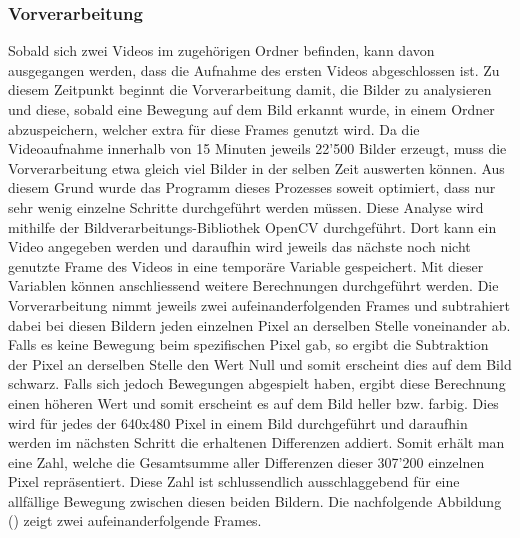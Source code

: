 \subsubsection{Vorverarbeitung}
Sobald sich zwei Videos im zugehörigen Ordner befinden, kann davon ausgegangen werden, dass die Aufnahme des ersten Videos abgeschlossen ist. Zu diesem Zeitpunkt beginnt die Vorverarbeitung damit, die Bilder zu analysieren und diese, sobald eine Bewegung auf dem Bild erkannt wurde, in einem Ordner abzuspeichern, welcher extra für diese Frames genutzt wird. Da die Videoaufnahme innerhalb von 15 Minuten jeweils 22'500 Bilder erzeugt, muss die Vorverarbeitung etwa gleich viel Bilder in der selben Zeit auswerten können. Aus diesem Grund wurde das Programm dieses Prozesses soweit optimiert, dass nur sehr wenig einzelne Schritte durchgeführt werden müssen. Diese Analyse wird mithilfe der Bildverarbeitungs-Bibliothek OpenCV durchgeführt. Dort kann ein Video angegeben werden und daraufhin wird jeweils das nächste noch nicht genutzte Frame des Videos in eine temporäre Variable gespeichert. Mit dieser Variablen können anschliessend weitere Berechnungen durchgeführt werden. Die Vorverarbeitung nimmt jeweils zwei aufeinanderfolgenden Frames und subtrahiert dabei bei diesen Bildern jeden einzelnen Pixel an derselben Stelle voneinander ab. Falls es keine Bewegung beim spezifischen Pixel gab, so ergibt die Subtraktion der Pixel an derselben Stelle den Wert Null und somit erscheint dies auf dem Bild schwarz. Falls sich jedoch Bewegungen abgespielt haben, ergibt diese Berechnung einen höheren Wert und somit erscheint es auf dem Bild heller bzw. farbig. Dies wird für jedes der 640x480 Pixel in einem Bild durchgeführt und daraufhin werden im nächsten Schritt die erhaltenen Differenzen addiert. Somit erhält man eine Zahl, welche die Gesamtsumme aller Differenzen dieser 307'200 einzelnen Pixel repräsentiert. Diese Zahl ist schlussendlich ausschlaggebend für eine allfällige Bewegung zwischen diesen beiden Bildern. Die nachfolgende Abbildung () zeigt zwei aufeinanderfolgende Frames.

